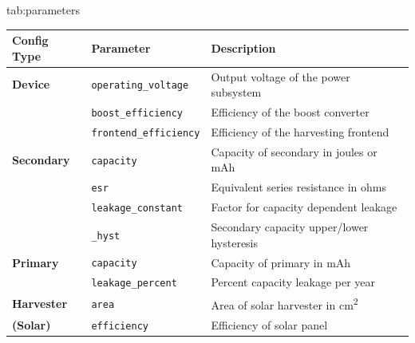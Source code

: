 \begin{definetable}{tab:parameters}
    \centering
    \begin{tabularx}{\columnwidth}{@{\extracolsep{\fill}} lll}
\hline
\textbf{Config Type}& \multicolumn{1}{l}{\textbf{Parameter}}                   & \multicolumn{1}{l}{\textbf{Description}} \\ \hline
\textbf{Device}     & \texttt{operating\_voltage}                              & Output voltage of the power subsystem    \\
                    & \texttt{boost\_efficiency}                               & Efficiency of the boost converter        \\
                    & \texttt{frontend\_efficiency}                            & Efficiency of the harvesting frontend    \\ \hline
\textbf{Secondary}  & \texttt{capacity}                                        & Capacity of secondary in joules or mAh   \\
                    & \texttt{esr}                                             & Equivalent series resistance in ohms     \\
                    & \texttt{leakage\_constant}                               & Factor for capacity dependent leakage    \\
                    & \texttt{\string{max, min\string}\_hyst}                  & Secondary capacity upper/lower hysteresis\\ \hline
\textbf{Primary}    & \texttt{capacity}                                        & Capacity of primary in mAh               \\
                    & \texttt{leakage\_percent}                                & Percent capacity leakage per year        \\ \hline
        \textbf{Harvester}  & \texttt{area}                                    & Area of solar harvester in cm\textsuperscript{2}\\
\textbf{(Solar)}    & \texttt{efficiency}                                      & Efficiency of solar panel                \\ \hline

\end{tabularx}
\end{definetable}

